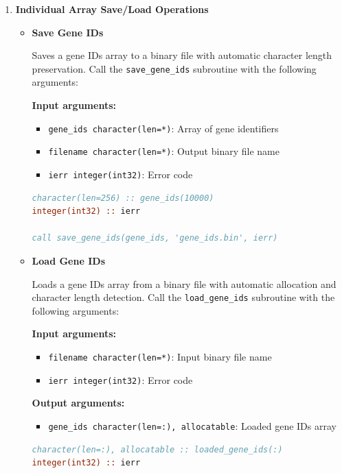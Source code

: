\documentclass[11pt]{article}
\begin{document}
\begin{enumerate}
	\item \textbf{Individual Array Save/Load Operations}
	      \begin{itemize}
	      	\item \textbf{Save Gene IDs}
	      	      
	      	      Saves a gene IDs array to a binary file with automatic character length
	      	      preservation. Call the \texttt{save\_gene\_ids} subroutine with the following
	      	      arguments:
	      	      
	      	      \textbf{Input arguments:}
	      	      \begin{itemize}
	      	      	\item \texttt{gene\_ids character(len=*)}: Array of gene identifiers
	      	      	      
	      	      	\item \texttt{filename character(len=*)}: Output binary file name
	      	      	      
	      	      	\item \texttt{ierr integer(int32)}: Error code
	      	      \end{itemize}
	      	      \begin{lstlisting}[language=Fortran, caption={Save Gene IDs Array}]
character(len=256) :: gene_ids(10000)
integer(int32) :: ierr

call save_gene_ids(gene_ids, 'gene_ids.bin', ierr)
	      	      \end{lstlisting}
	      	      
	      	\item \textbf{Load Gene IDs}
	      	      
	      	      Loads a gene IDs array from a binary file with automatic allocation and
	      	      character length detection. Call the \texttt{load\_gene\_ids} subroutine
	      	      with the following arguments:
	      	      
	      	      \textbf{Input arguments:}
	      	      \begin{itemize}
	      	      	\item \texttt{filename character(len=*)}: Input binary file name
	      	      	      
	      	      	\item \texttt{ierr integer(int32)}: Error code
	      	      \end{itemize}
	      	      \textbf{Output arguments:}
	      	      \begin{itemize}
	      	      	\item \texttt{gene\_ids character(len=:), allocatable}: Loaded gene IDs
	      	      	      array
	      	      \end{itemize}
	      	      \begin{lstlisting}[language=Fortran, caption={Load Gene IDs Array}]
character(len=:), allocatable :: loaded_gene_ids(:)
integer(int32) :: ierr


\end{lstlisting}
\end{itemize}
\end{enumerate}
\end{document}
